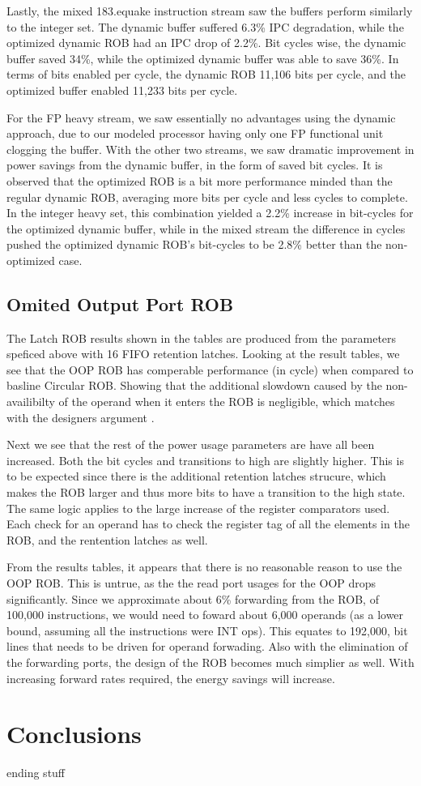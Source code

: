Lastly, the mixed 183.equake instruction stream saw the buffers perform similarly to the integer set. The dynamic buffer suffered 6.3\% IPC degradation, while the optimized dynamic ROB had an IPC drop of 2.2\%. Bit cycles wise, the dynamic buffer saved 34\%, while the optimized dynamic buffer was able to save 36\%. In terms of bits enabled per cycle, the dynamic ROB 11,106 bits per cycle, and the optimized buffer enabled 11,233 bits per cycle.

For the FP heavy stream, we saw essentially no advantages using the dynamic approach, due to our modeled processor having only one FP functional unit clogging the buffer. With the other two streams, we saw dramatic improvement in power savings from the dynamic buffer, in the form of saved bit cycles. It is observed that the optimized ROB is a bit more performance minded than the regular dynamic ROB, averaging more bits per cycle and less cycles to complete. In the integer heavy set, this combination yielded a 2.2\% increase in bit-cycles for the optimized dynamic buffer, while in the mixed stream the difference in cycles pushed the optimized dynamic ROB's bit-cycles to be 2.8\% better than the non-optimized case.

\subsection{Omited Output Port ROB}
The Latch ROB results shown in the tables are produced from the parameters 
speficed above with 16 FIFO retention latches. Looking at the result tables,
 we see that the OOP ROB has comperable performance (in cycle) when compared 
to basline Circular ROB.  Showing that the additional slowdown caused by the
 non-availibilty of the operand when it enters the ROB is negligible, which
matches with the designers argument \cite{kucuk}.  

Next we see that the rest of the power usage parameters are have all been 
increased.  Both the bit cycles and transitions to high are slightly higher.
This is to be expected since there is the additional retention latches 
strucure, which makes the ROB larger and thus more bits to have a transition
to the high state.  The same logic applies to the large increase of the
register comparators used.  Each check for an operand has to check the
register tag of all the elements in the ROB, and the rentention latches 
as well.  

From the results tables, it appears that there is no reasonable reason to use
the OOP ROB.  This is untrue, as the the read port usages for the OOP drops
significantly.  Since we approximate about 6\% forwarding from the ROB, of 
100,000 instructions, we would need to foward about 6,000 operands (as a
lower bound, assuming all the instructions were INT ops).  This equates to
192,000, bit lines that needs to be driven for operand forwading.  Also with
the elimination of the forwarding ports, the design of the ROB becomes much 
simplier as well. With increasing forward rates required, the energy savings
will increase.


\section{Conclusions}
ending stuff
